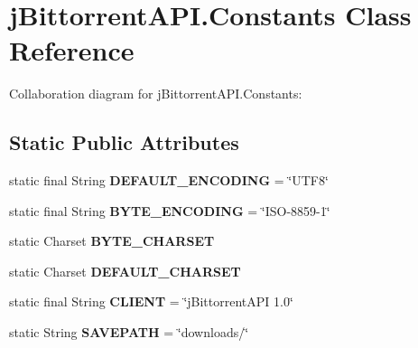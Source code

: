 \hypertarget{classj_bittorrent_a_p_i_1_1_constants}{
\section{jBittorrentAPI.Constants Class Reference}
\label{classj_bittorrent_a_p_i_1_1_constants}
}
Collaboration diagram for jBittorrentAPI.Constants:\subsection*{Static Public Attributes}
\begin{DoxyCompactItemize}
\item 
\hypertarget{classj_bittorrent_a_p_i_1_1_constants_a02ca183ac63a2542bafe796787aa179b}{
static final String {\bfseries DEFAULT\_\-ENCODING} = \char`\"{}UTF8\char`\"{}}
\label{classj_bittorrent_a_p_i_1_1_constants_a02ca183ac63a2542bafe796787aa179b}

\item 
\hypertarget{classj_bittorrent_a_p_i_1_1_constants_a36e25822c54d870f46ef66159ab69937}{
static final String {\bfseries BYTE\_\-ENCODING} = \char`\"{}ISO-\/8859-\/1\char`\"{}}
\label{classj_bittorrent_a_p_i_1_1_constants_a36e25822c54d870f46ef66159ab69937}

\item 
\hypertarget{classj_bittorrent_a_p_i_1_1_constants_ac06a93fc96186924c3770248c01d0e57}{
static Charset {\bfseries BYTE\_\-CHARSET}}
\label{classj_bittorrent_a_p_i_1_1_constants_ac06a93fc96186924c3770248c01d0e57}

\item 
\hypertarget{classj_bittorrent_a_p_i_1_1_constants_aa630e52611597a9e6d66cd53db0c3567}{
static Charset {\bfseries DEFAULT\_\-CHARSET}}
\label{classj_bittorrent_a_p_i_1_1_constants_aa630e52611597a9e6d66cd53db0c3567}

\item 
\hypertarget{classj_bittorrent_a_p_i_1_1_constants_a8da4bef61385cf2e11b7c14ae2276db4}{
static final String {\bfseries CLIENT} = \char`\"{}jBittorrentAPI 1.0\char`\"{}}
\label{classj_bittorrent_a_p_i_1_1_constants_a8da4bef61385cf2e11b7c14ae2276db4}

\item 
\hypertarget{classj_bittorrent_a_p_i_1_1_constants_afa05068b7f8aa387b0cba091059e6e32}{
static String {\bfseries SAVEPATH} = \char`\"{}downloads/\char`\"{}}
\label{classj_bittorrent_a_p_i_1_1_constants_afa05068b7f8aa387b0cba091059e6e32}


\end{DoxyCompactItemize}
